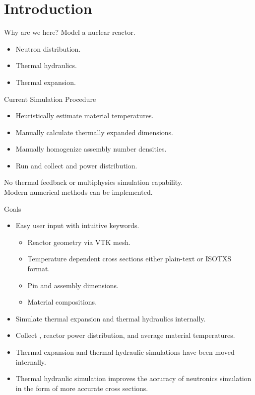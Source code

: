 \section{Introduction}
\label{sec:introduction}

\begin{frame}{Why are we here?}
  \pause
  {\huge Model a nuclear reactor.}
  \pause
  \begin{itemize}
    \item Neutron distribution.
    \item Thermal hydraulics.
    \item Thermal expansion.
  \end{itemize}
\end{frame}

\begin{frame}{Current Simulation Procedure}
  \begin{itemize}
    \item Heuristically estimate material temperatures.
    \item Manually calculate thermally expanded dimensions.
    \item Manually homogenize assembly number densities.
    \item Run \dif and collect \keff and power distribution.
    \pause
  \end{itemize}
  \vspace{0.3in}
  \begin{block}{}
    \centering
    No thermal feedback or multiphysics simulation capability.\\
    Modern numerical methods can be implemented.
  \end{block}
\end{frame}

\begin{frame}{Goals}
  \begin{itemize}
    \item Easy user input with intuitive keywords.
      \begin{itemize}
        \item Reactor geometry via VTK mesh.
        \item Temperature dependent cross sections either plain-text or ISOTXS
          format.
        \item Pin and assembly dimensions.
        \item Material compositions.
      \end{itemize}
    \item Simulate thermal expansion and thermal hydraulics internally.
    \item Collect \keff, reactor power distribution, and average material 
      temperatures.
  \end{itemize}
  \vspace{0.2in}
  \begin{itemize}
    \item Thermal expansion and thermal hydraulic simulations have been moved
      internally.
    \item Thermal hydraulic simulation improves the accuracy of neutronics
      simulation in the form of more accurate cross sections.
  \end{itemize}
\end{frame}
